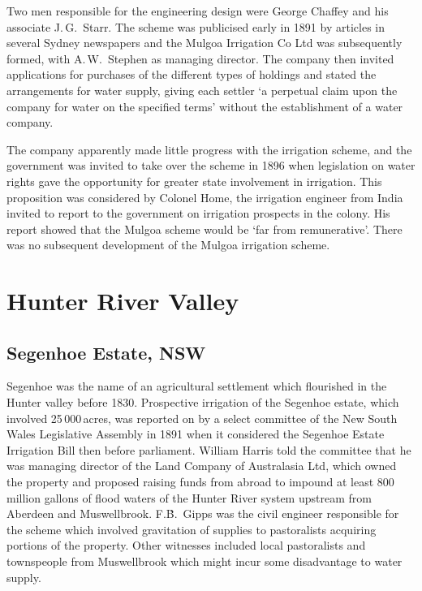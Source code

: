 Two men responsible for the engineering design were George Chaffey and
his associate J.\,G.~Starr.  The scheme was
publicised early in 1891 by articles in several Sydney newspapers and
the Mulgoa Irrigation Co Ltd was subsequently formed, with
A.\,W.~Stephen  as managing director.  The
company then invited applications for purchases of the different types
of holdings and stated the arrangements for water supply, giving each
settler `a perpetual claim upon the company for water on the specified
terms' without the establishment of a water company.

The company apparently made little progress with the irrigation
sch\-eme, and the government was invited to take over the scheme in
1896 when legislation on water rights gave the opportunity for greater
state involvement in irrigation.  This proposition was considered by
Colonel Home,  the irrigation engineer from India
invited to report to the government on irrigation prospects in the
colony.  His report showed that the Mulgoa scheme would be `far from
remunerative'.  There was no subsequent development of the Mulgoa
irrigation scheme.

\section*{Hunter River Valley}

\subsection*{Segenhoe Estate, NSW}

Segenhoe was the name of an agricultural settlement which flourished
in the Hunter valley before 1830.  Prospective irrigation of the
Segenhoe estate, which involved 25\,000\,acres, was reported on by a
select committee of the New South Wales Legislative Assembly in 1891
when it considered the Segenhoe Estate Irrigation Bill then before
parliament.  William Harris told the committee that he was managing
director of the Land Company of Australasia Ltd, which owned the
property and proposed raising funds from abroad to impound at least
800 million gallons of flood waters of the Hunter River
system upstream from Aberdeen and Muswellbrook.  F.\.B.~Gipps
 was the civil engineer responsible for the
scheme which involved gravitation of supplies to pastoralists
acquiring portions of the property.  Other witnesses included local
pastoralists and townspeople from Muswellbrook which might incur some
disadvantage to water supply.

